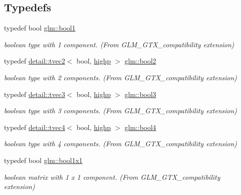 \subsection*{Typedefs}
\begin{DoxyCompactItemize}
\item 
typedef bool \hyperlink{group__gtx__compatibility_gab65f19f5170f95a2f06d6aa6482c9405}{glm\+::bool1}
\begin{DoxyCompactList}\small\item\em boolean type with 1 component. (From G\+L\+M\+\_\+\+G\+T\+X\+\_\+compatibility extension) \end{DoxyCompactList}\item 
typedef \hyperlink{structglm_1_1detail_1_1tvec2}{detail\+::tvec2}$<$ bool, \hyperlink{namespaceglm_a0f04f086094c747d227af4425893f545ac6f7eab42eacbb10d59a58e95e362074}{highp} $>$ \hyperlink{group__gtx__compatibility_gafede6e8549e9bb9da63f404022298d40}{glm\+::bool2}
\begin{DoxyCompactList}\small\item\em boolean type with 2 components. (From G\+L\+M\+\_\+\+G\+T\+X\+\_\+compatibility extension) \end{DoxyCompactList}\item 
typedef \hyperlink{structglm_1_1detail_1_1tvec3}{detail\+::tvec3}$<$ bool, \hyperlink{namespaceglm_a0f04f086094c747d227af4425893f545ac6f7eab42eacbb10d59a58e95e362074}{highp} $>$ \hyperlink{group__gtx__compatibility_gad18ebb149851844fd704e138c4af9a44}{glm\+::bool3}
\begin{DoxyCompactList}\small\item\em boolean type with 3 components. (From G\+L\+M\+\_\+\+G\+T\+X\+\_\+compatibility extension) \end{DoxyCompactList}\item 
typedef \hyperlink{structglm_1_1detail_1_1tvec4}{detail\+::tvec4}$<$ bool, \hyperlink{namespaceglm_a0f04f086094c747d227af4425893f545ac6f7eab42eacbb10d59a58e95e362074}{highp} $>$ \hyperlink{group__gtx__compatibility_ga6ef1f104d22f384c4d59f2b1ca1768a7}{glm\+::bool4}
\begin{DoxyCompactList}\small\item\em boolean type with 4 components. (From G\+L\+M\+\_\+\+G\+T\+X\+\_\+compatibility extension) \end{DoxyCompactList}\item 
typedef bool \hyperlink{group__gtx__compatibility_ga98d9d3da22aebc872ba38ce5afa0eff7}{glm\+::bool1x1}
\begin{DoxyCompactList}\small\item\em boolean matrix with 1 x 1 component. (From G\+L\+M\+\_\+\+G\+T\+X\+\_\+compatibility extension) \end{DoxyCompactList}\item 

\end{DoxyCompactItemize}
